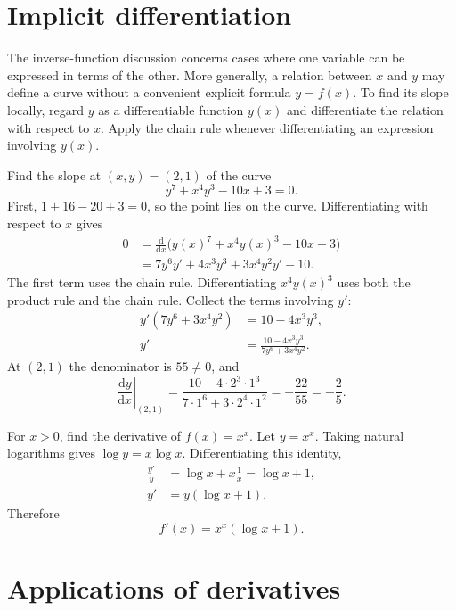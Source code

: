 \section{Implicit differentiation}

The inverse-function discussion concerns cases where one variable can be
expressed in terms of the other. More generally, a relation between $x$ and $y$
may define a curve without a convenient explicit formula $y=f(x)$.
To find its slope locally, regard $y$ as a differentiable function $y(x)$
and differentiate the relation with respect to $x$. Apply the chain rule
whenever differentiating an expression involving $y(x)$.

\begin{example}
Find the slope at $(x,y)=(2,1)$ of the curve
\[
 y^7+x^4y^3-10x+3=0.
\]
First, $1+16-20+3=0$, so the point lies on the curve.
Differentiating with respect to $x$ gives
\begin{align*}
 0
 &=\frac{\mathrm d}{\mathrm dx}
   \bigl(y(x)^7+x^4y(x)^3-10x+3\bigr)\\
 &=7y^6y'+4x^3y^3+3x^4y^2y'-10.
\end{align*}
The first term uses the chain rule. Differentiating $x^4y(x)^3$ uses both
the product rule and the chain rule. Collect the terms involving $y'$:
\begin{align*}
 y'(7y^6+3x^4y^2)&=10-4x^3y^3,\\
 y'&=\frac{10-4x^3y^3}{7y^6+3x^4y^2}.
\end{align*}
At $(2,1)$ the denominator is $55\ne0$, and
\[
 \left.\frac{\mathrm dy}{\mathrm dx}\right|_{(2,1)}
 =\frac{10-4\cdot2^3\cdot1^3}{7\cdot1^6+3\cdot2^4\cdot1^2}
 =-\frac{22}{55}=-\frac25.
\]
\end{example}

\begin{example}
For $x>0$, find the derivative of $f(x)=x^x$.
Let $y=x^x$. Taking natural logarithms gives $\log y=x\log x$.
Differentiating this identity,
\begin{align*}
 \frac{y'}{y}&=\log x+x\frac1x=\log x+1,\\
 y'&=y(\log x+1).
\end{align*}
Therefore
\[
 \boxed{f'(x)=x^x(\log x+1)}.
\]
\end{example}

\section{Applications of derivatives}


